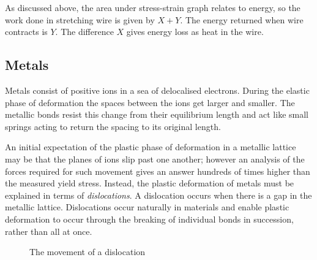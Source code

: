 \documentclass[a4paper,12pt]{book}
\begin{document}
As discussed above, the area under stress-strain graph relates to energy, so the work done in stretching wire is given by $X+Y$. The energy returned when wire contracts is $Y$. The difference $X$ gives energy loss as heat in the wire.

\subsection{Metals}
Metals consist of positive ions in a sea of delocalised electrons. During the elastic phase of deformation the spaces between the ions get larger and smaller. The metallic bonds resist this change from their equilibrium length and act like small springs acting to return the spacing to its original length.

An initial expectation of the plastic phase of deformation in a metallic lattice may be that the planes of ions slip past one another; however an analysis of the forces required for such movement gives an answer hundreds of times higher than the measured yield stress. Instead, the plastic deformation of metals must be explained in terms of \emph{dislocations}. A dislocation occurs when there is a gap in the metallic lattice. Dislocations occur naturally in materials and enable plastic deformation to occur through the breaking of individual bonds in succession, rather than all at once.

\begin{figure}[h]\begin{center}
    \caption{The movement of a dislocation}\label{disloc}
\end{center}\end{figure}
\end{document}
